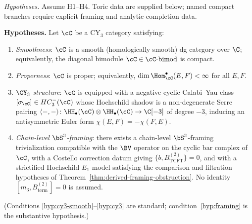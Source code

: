 \begin{theorem}[\texorpdfstring{$\Phi.3$}{Phi.3}: framed object-level \texorpdfstring{$d = 3$}{d = 3} locus]
\label{thm:cy-to-chiral-d3}
\noindent\emph{Hypotheses.} Assume \textup{H1--H4}. Toric data are supplied below; named compact branches require explicit framing and analytic-completion data.

\medskip\noindent\textbf{Hypotheses.}
Let $\cC$ be a CY$_3$ category satisfying:
\begin{enumerate}[label=\textup{(H\arabic*)}]
 \item\label{hyp:cy3-smooth} \emph{Smoothness}: $\cC$ is a smooth (homologically smooth) dg category over $\C$; equivalently, the diagonal bimodule $\cC \in \cC\text{-}\mathrm{bimod}$ is compact.
 \item\label{hyp:proper} \emph{Properness}: $\cC$ is proper; equivalently, $\dim \Hom^\bullet_\cC(E, F) < \infty$ for all $E, F$.
 \item\label{hyp:cy3} \emph{$\CY_3$ structure}: $\cC$ is equipped with a negative-cyclic Calabi--Yau class $[\sigma_\cC]\in HC^-_3(\cC)$ whose Hochschild shadow is a non-degenerate Serre pairing $\langle -, - \rangle \colon \HH_\bullet(\cC) \otimes \HH_\bullet(\cC) \to \C[-3]$ of degree $-3$, inducing an antisymmetric Euler form $\chi(E, F) = -\chi(F, E)$.
 \item\label{hyp:framing} \emph{Chain-level $\bS^3$-framing}: there exists a chain-level $\bS^3$-framing trivialization compatible with the $\BV$ operator on the cyclic bar complex of $\cC$, with a Costello correction datum giving $\{b,B^{(2)}_{\mathrm{TCFT}}\}=0$, and with a strictified Hochschild $E_1$-model satisfying the comparison and filtration hypotheses of Theorem~\ref{thm:derived-framing-obstruction}. No identity $[m_3,B^{(2)}_{\mathrm{term}}]=0$ is assumed.
\end{enumerate}
\textup{(}Conditions \ref{hyp:cy3-smooth}--\ref{hyp:cy3} are standard; condition~\ref{hyp:framing} is the substantive hypothesis.\textup{)}


\end{theorem}
